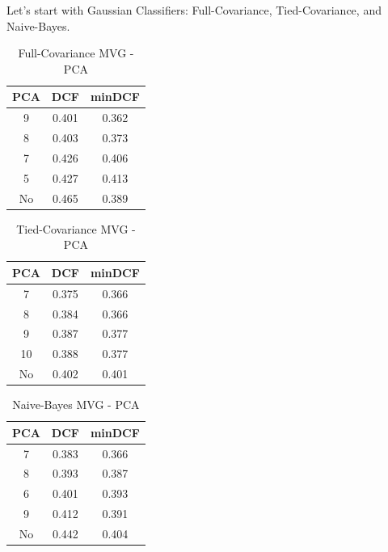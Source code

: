 \documentclass[twocolumn]{article}
\begin{document}
Let's start with Gaussian Classifiers: Full-Covariance, Tied-Covariance, and Naive-Bayes.

\begin{table}[H]
    \centering
        \begin{tabular}{||c|c|c||}
            \hline
            PCA & DCF & minDCF \\
            \hline
            \hline
            9 & 0.401 & 0.362 \\
            8 & 0.403 & 0.373 \\
            7 & 0.426 & 0.406 \\
            5 & 0.427 & 0.413 \\
            \hline
            No  & 0.465 & 0.389 \\
            \hline
    \end{tabular}
    \caption{Full-Covariance MVG - PCA}
\end{table}

\begin{table}[H]
    \centering
        \begin{tabular}{||c|c|c||}
            \hline
            PCA & DCF & minDCF \\
            \hline
            \hline
            7 & 0.375 & 0.366 \\
            8 & 0.384 & 0.366 \\
            9 & 0.387 & 0.377 \\
            10 & 0.388 & 0.377 \\
            \hline
            No  & 0.402 & 0.401 \\
            \hline
    \end{tabular}
    \caption{Tied-Covariance MVG - PCA}
\end{table}


\begin{table}[H]
    \centering
        \begin{tabular}{||c|c|c||}
            \hline
            PCA & DCF & minDCF \\
            \hline
            \hline
            7 & 0.383 & 0.366 \\
            8 & 0.393 & 0.387 \\
            6 & 0.401 & 0.393 \\
            9 & 0.412 & 0.391 \\
            \hline
            No  & 0.442 & 0.404 \\
            \hline
    \end{tabular}
    \caption{Naive-Bayes MVG - PCA}
\end{table}
\end{document}
